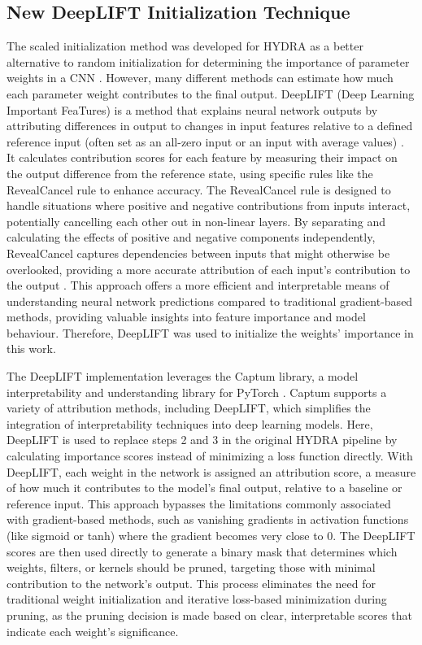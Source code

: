 \documentclass[journal,onecolumn,12pt]{IEEEtran}
\begin{document}
\subsection{New DeepLIFT Initialization Technique}
The scaled initialization method was developed for HYDRA as a better alternative to random initialization for determining the importance of parameter weights in a CNN \cite{hydra}. However, many different methods can estimate how much each parameter weight contributes to the final output. DeepLIFT (Deep Learning Important FeaTures) is a method that explains neural network outputs by attributing differences in output to changes in input features relative to a defined reference input (often set as an all-zero input or an input with average values) \cite{deeplift}. It calculates contribution scores for each feature by measuring their impact on the output difference from the reference state, using specific rules like the RevealCancel rule to enhance accuracy. The RevealCancel rule is designed to handle situations where positive and negative contributions from inputs interact, potentially cancelling each other out in non-linear layers. By separating and calculating the effects of positive and negative components independently, RevealCancel captures dependencies between inputs that might otherwise be overlooked, providing a more accurate attribution of each input’s contribution to the output \cite{deeplift}. This approach offers a more efficient and interpretable means of understanding neural network predictions compared to traditional gradient-based methods, providing valuable insights into feature importance and model behaviour. Therefore, DeepLIFT was used to initialize the weights' importance in this work. 

The DeepLIFT implementation leverages the Captum library, a model interpretability and understanding library for PyTorch \cite{captum}. Captum supports a variety of attribution methods, including DeepLIFT, which simplifies the integration of interpretability techniques into deep learning models. Here, DeepLIFT is used to replace steps 2 and 3 in the original HYDRA pipeline by calculating importance scores instead of minimizing a loss function directly. With DeepLIFT, each weight in the network is assigned an attribution score, a measure of how much it contributes to the model’s final output, relative to a baseline or reference input. This approach bypasses the limitations commonly associated with gradient-based methods, such as vanishing gradients in activation functions (like sigmoid or tanh) where the gradient becomes very close to 0. The DeepLIFT scores are then used directly to generate a binary mask that determines which weights, filters, or kernels should be pruned, targeting those with minimal contribution to the network's output. This process eliminates the need for traditional weight initialization and iterative loss-based minimization during pruning, as the pruning decision is made based on clear, interpretable scores that indicate each weight’s significance.
\end{document}

